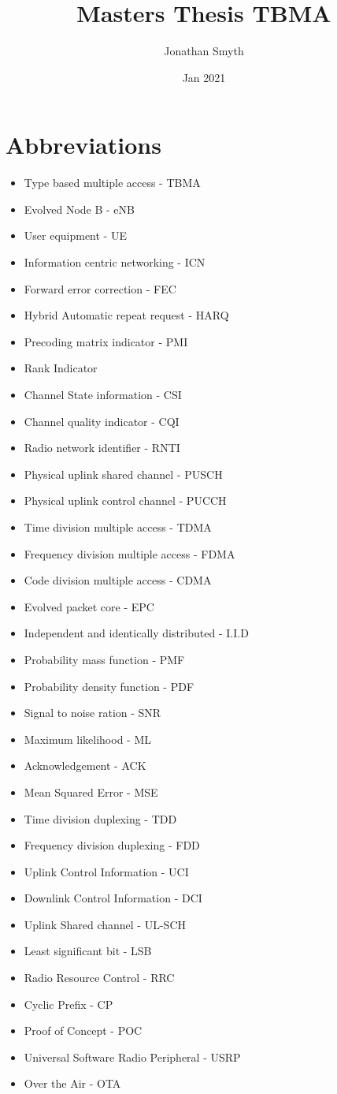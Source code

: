 \documentclass{article}
\title{Masters Thesis TBMA}
\author{Jonathan Smyth}
\date{Jan 2021}
\begin{document}
\maketitle
\tableofcontents

\section{Abbreviations}
\begin{itemize}
\item Type based multiple access - TBMA
\item Evolved Node B - eNB
\item User equipment - UE
\item Information centric networking - ICN
\item Forward error correction - FEC
\item Hybrid Automatic repeat request - HARQ
\item Precoding matrix indicator - PMI 
\item Rank Indicator 
\item Channel State information - CSI 
\item Channel quality indicator - CQI 
\item Radio network identifier - RNTI
\item Physical uplink shared channel - PUSCH
\item Physical uplink control channel - PUCCH
\item Time division multiple access - TDMA 
\item Frequency division multiple access - FDMA
\item Code division multiple access - CDMA
\item Evolved packet core - EPC
\item Independent and identically distributed - I.I.D
\item Probability mass function - PMF
\item Probability density function - PDF
\item Signal to noise ration - SNR 
\item Maximum likelihood - ML
\item Acknowledgement - ACK
\item Mean Squared Error - MSE 
\item Time division duplexing - TDD
\item Frequency division duplexing - FDD
\item Uplink Control Information - UCI
\item Downlink Control Information - DCI
\item Uplink Shared channel - UL-SCH 
\item Least significant bit - LSB
\item Radio Resource Control - RRC
\item Cyclic Prefix - CP
\item Proof of Concept - POC
\item Universal Software Radio Peripheral - USRP
\item Over the Air - OTA
\end{itemize} 
\end{document}

